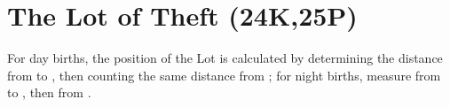 \section{The Lot of Theft (24K,25P)}

For day births, the position of the Lot is calculated by determining the distance from \Mercury\xspace to \Mars,
then counting the same distance from \Saturn; for night births, measure from \Mars\xspace to \Mercury, then from \Saturn.

\newpage